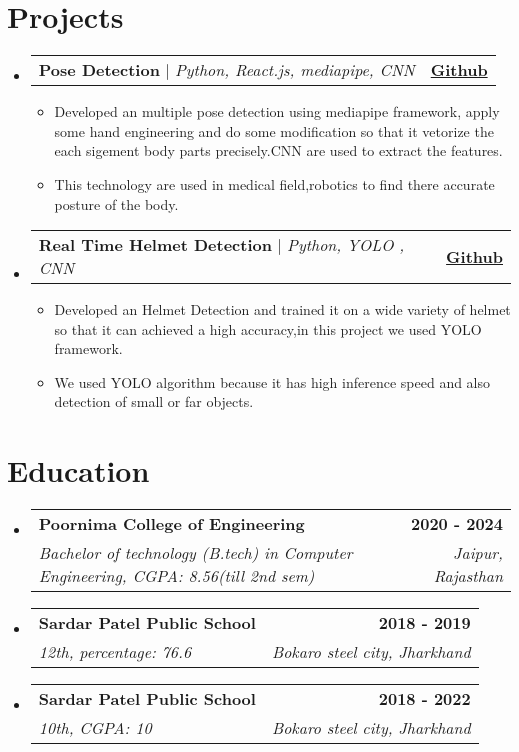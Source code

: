 \documentclass[letterpaper,11pt]{article}
\makeatletter
\newcommand{\resumeItem}[1]{
  \item\small{
    {#1 \vspace{-2pt}}
  }
}
\newcommand{\resumeSubheading}[4]{
  \vspace{-2pt}\item
    \begin{tabular*}{1.0\textwidth}[t]{l@{\extracolsep{\fill}}r}
      \textbf{#1} & \textbf{\small #2} \\
      \textit{\small#3} & \textit{\small #4} \\
    \end{tabular*}\vspace{-7pt}
}
\newcommand{\resumeProjectHeading}[2]{
    \item
    \begin{tabular*}{1.001\textwidth}{l@{\extracolsep{\fill}}r}
      \small#1 & \textbf{\small #2}\\
    \end{tabular*}\vspace{-7pt}
}
\newcommand{\resumeSubHeadingListStart}{\begin{itemize}[leftmargin=0.0in, label={}]}
\newcommand{\resumeSubHeadingListEnd}{\end{itemize}}
\newcommand{\resumeItemListStart}{\begin{itemize}}
\newcommand{\resumeItemListEnd}{\end{itemize}\vspace{-5pt}}
\makeatother
\begin{document}
\section{Projects}
    \vspace{-5pt}
    \resumeSubHeadingListStart
    
        \resumeProjectHeading
          {\textbf{Pose Detection} $|$ \emph{ Python, React.js, mediapipe, CNN}}{\href{https://github.com/anubhavanand1516/pose_detection_Rootally}{Github}}
          \resumeItemListStart
            \resumeItem{Developed an multiple pose detection using mediapipe framework, apply some hand engineering and do some modification so that it vetorize the each sigement body parts  precisely.CNN are used to extract the features.}
              \resumeItem{This technology are used in medical field,robotics to find there accurate posture of the body.}
          \resumeItemListEnd 
          \vspace{-13pt}
          
      \resumeProjectHeading
          {\textbf{Real Time Helmet Detection} $|$ \emph{ Python, YOLO , CNN }}{\href{https://github.com/anubhavanand1516/Artenal_assignment-}{Github}}
          \resumeItemListStart
            \resumeItem{ Developed an Helmet Detection and trained it on a wide variety of helmet so that it can achieved a high accuracy,in this
project we used YOLO framework.}
            \resumeItem{ We used YOLO algorithm because it has high inference speed and also detection of small or far objects.}
          \resumeItemListEnd
    \resumeSubHeadingListEnd
\section{Education}
  \resumeSubHeadingListStart
    \resumeSubheading
      {Poornima College of Engineering}{2020 - 2024}
      {Bachelor of technology (B.tech) in Computer Engineering, CGPA: 8.56(till 2nd sem)}{Jaipur, Rajasthan}
  \resumeSubHeadingListEnd
    \resumeSubHeadingListStart
    \resumeSubheading
      {Sardar Patel Public School}{2018 - 2019}
      {12th, percentage: 76.6}{Bokaro steel city, Jharkhand}
  \resumeSubHeadingListEnd
    \resumeSubHeadingListStart
    \resumeSubheading
      {Sardar Patel Public School}{2018 - 2022}
      {10th, CGPA: 10}{Bokaro steel city, Jharkhand}
  \resumeSubHeadingListEnd
 
%
\end{document}
